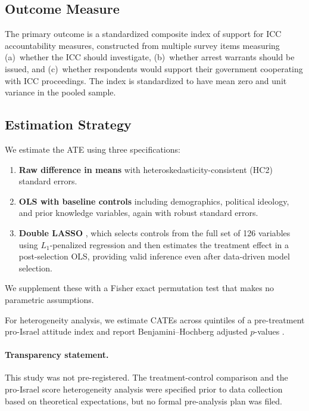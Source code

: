 \documentclass[12pt]{article}
\begin{document}
\subsection{Outcome Measure}

The primary outcome is a standardized composite index of support for ICC accountability measures, constructed from multiple survey items measuring (a)~whether the ICC should investigate, (b)~whether arrest warrants should be issued, and (c)~whether respondents would support their government cooperating with ICC proceedings. The index is standardized to have mean zero and unit variance in the pooled sample.

\subsection{Estimation Strategy}

We estimate the ATE using three specifications:

\begin{enumerate}
    \item \textbf{Raw difference in means} with heteroskedasticity-consistent (HC2) standard errors.
    \item \textbf{OLS with baseline controls} including demographics, political ideology, and prior knowledge variables, again with robust standard errors.
    \item \textbf{Double LASSO} \citep{belloni2014inference}, which selects controls from the full set of 126 variables using $L_1$-penalized regression and then estimates the treatment effect in a post-selection OLS, providing valid inference even after data-driven model selection.
\end{enumerate}

We supplement these with a Fisher exact permutation test \citep{fisher1935design} that makes no parametric assumptions.

For heterogeneity analysis, we estimate CATEs across quintiles of a pre-treatment pro-Israel attitude index and report Benjamini--Hochberg adjusted $p$-values \citep{benjamini1995controlling}.

\paragraph{Transparency statement.} This study was not pre-registered. The treatment-control comparison and the pro-Israel score heterogeneity analysis were specified prior to data collection based on theoretical expectations, but no formal pre-analysis plan was filed.
\end{document}
